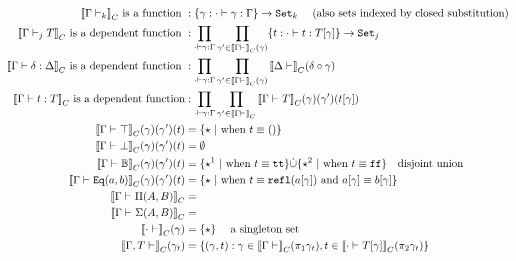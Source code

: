 \begin{align*}
  \denotesC{\goodCtx{\Gm}{k}} \text{ is a function }&: \{\gm : \goodSub{\cdot}{\gm}{\Gm} \} \to \Set{k} \quad \text{ (also sets indexed by closed substitution)}\\
  \denotesC{\goodType{\Gm}{T}{j}} \text{ is a dependent function }&: \prod_{\goodSub{\cdot}{\gm}{\Gm}}\prod_{\gm' \in \denotesC{\goodCtx{\Gm}{}}(\gm)}\{t : \goodTerm{\cdot}{t}{\sub{T}{\gm}}\}\to\Set{j} \\
  \denotesC{\goodSub{\Gm}{\delta}{\Delta}} \text{ is a dependent function }&: \prod_{\goodSub{\cdot}{\gm}{\Gm}} \prod_{\gm' \in \denotesC{\goodCtx{\Gm}{}}(\gm)} \denotesC{\goodCtx{\Dl}{}}(\delta \circ \gm) \\
  \denotesC{\goodTerm{\Gm}{t}{T}} \text{ is a dependent function}&: \prod_{\goodSub{\cdot}{\gm}{\Gm}} \prod_{\gm' \in \denotesC{\goodCtx{\Gm}{}}}\denotesC{\goodType{\Gm}{T}{}}(\gm)(\gm')(\sub{t}{\gm})\\
  \denotesC{\goodType{\Gm}{\top}{}}(\gm)(\gm')(t) &= \{\star \ | \text{  when } t \equiv \unit \} \\
  \denotesC{\goodType{\Gm}{\bot}{}}(\gm)(\gm')(t) &= \emptyset \\
  \denotesC{\goodType{\Gm}{\cB}{}}(\gm)(\gm')(t) &= \{\star^1 \ | \text{ when } t \equiv \true  \} \dot{\cup} \{\star^2 \ | \text{ when } t \equiv \false  \} \quad \text{disjoint union} \\
  \denotesC{\goodType{\Gm}{\TyId{a}{b}}{}}(\gm)(\gm')(t) &= \{\star \ |  \text{ when } t \equiv \eqrefl{\sub{a}{\gm}} \text{ and } \sub{a}{\gm} \equiv \sub{b}{\gm} \} \\
  \denotesC{\goodType{\Gm}{\TyPi{A}{B}}{}} &= \\
  \denotesC{\goodType{\Gm}{\TySigma{A}{B}}{}} &= \\
  \denotesC{\goodCtx{\cdot}{}}(\gm) &= \{\star\} \quad \text{  a singleton set } \\ 
  \denotesC{\goodCtx{\Gm, T}{}}(\gm_t) &= \{ (\gamma , t) : \gamma \in \denotesC{\goodCtx{\Gm}{}}(\pi_1 \gm_t), t \in \denotesC{\goodType{\cdot}{\sub{T}{\gm}}{}}(\pi_2 \gm_t)  \} \\

\end{align*}

